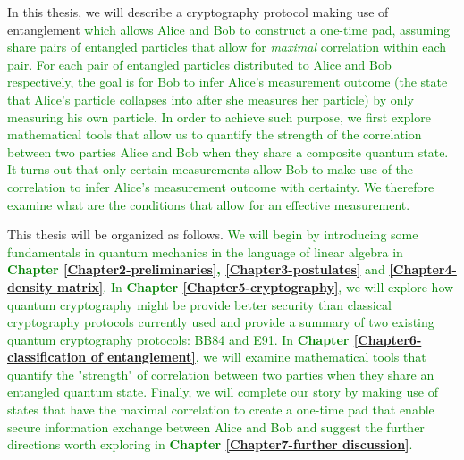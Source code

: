 In this thesis, we will describe a cryptography protocol making use of entanglement \textcolor{green}{which allows Alice and Bob to construct a one-time pad, assuming share pairs of entangled particles that allow for \emph{maximal} correlation within each pair. For each pair of entangled particles distributed to Alice and Bob respectively, the goal is for Bob to infer Alice's measurement outcome (the state that Alice's particle collapses into after she measures her particle) by only measuring his own particle. In order to achieve such purpose, we first explore mathematical tools that allow us to quantify the strength of the correlation between two parties Alice and Bob when they share a composite quantum state. It turns out that only certain measurements allow Bob to make use of the correlation to infer Alice's measurement outcome with certainty. We therefore examine what are the conditions that allow for an effective measurement.}

This thesis will be organized as follows. 
\textcolor{green}{We will begin by introducing some fundamentals in quantum mechanics in the language of linear algebra in \textbf{Chapter \ref{Chapter2-preliminaries}, \ref{Chapter3-postulates}} and \textbf{\ref{Chapter4-density matrix}}. In \textbf{Chapter \ref{Chapter5-cryptography}}, we will explore how quantum cryptography might be provide better security than classical cryptography protocols currently used and provide a summary of two existing quantum cryptography protocols: BB84 and E91. In \textbf{Chapter \ref{Chapter6-classification of entanglement}}, we will examine mathematical tools that quantify the "strength" of correlation between two parties when they share an entangled quantum state. Finally, we will complete our story by making use of states that have the maximal correlation to create a one-time pad that enable secure information exchange between Alice and Bob and suggest the further directions worth exploring in \textbf{Chapter \ref{Chapter7-further discussion}}.}



